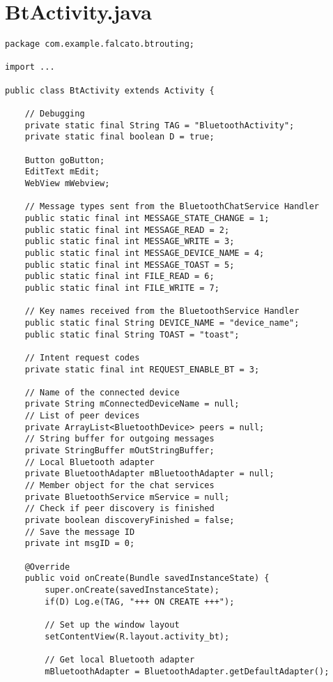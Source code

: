 \section{BtActivity.java}
\label{appendix:BtActivity}
\begin{verbatim}
package com.example.falcato.btrouting;

import ...

public class BtActivity extends Activity {

    // Debugging
    private static final String TAG = "BluetoothActivity";
    private static final boolean D = true;

    Button goButton;
    EditText mEdit;
    WebView mWebview;

    // Message types sent from the BluetoothChatService Handler
    public static final int MESSAGE_STATE_CHANGE = 1;
    public static final int MESSAGE_READ = 2;
    public static final int MESSAGE_WRITE = 3;
    public static final int MESSAGE_DEVICE_NAME = 4;
    public static final int MESSAGE_TOAST = 5;
    public static final int FILE_READ = 6;
    public static final int FILE_WRITE = 7;

    // Key names received from the BluetoothService Handler
    public static final String DEVICE_NAME = "device_name";
    public static final String TOAST = "toast";

    // Intent request codes
    private static final int REQUEST_ENABLE_BT = 3;

    // Name of the connected device
    private String mConnectedDeviceName = null;
    // List of peer devices
    private ArrayList<BluetoothDevice> peers = null;
    // String buffer for outgoing messages
    private StringBuffer mOutStringBuffer;
    // Local Bluetooth adapter
    private BluetoothAdapter mBluetoothAdapter = null;
    // Member object for the chat services
    private BluetoothService mService = null;
    // Check if peer discovery is finished
    private boolean discoveryFinished = false;
    // Save the message ID
    private int msgID = 0;

    @Override
    public void onCreate(Bundle savedInstanceState) {
        super.onCreate(savedInstanceState);
        if(D) Log.e(TAG, "+++ ON CREATE +++");

        // Set up the window layout
        setContentView(R.layout.activity_bt);

        // Get local Bluetooth adapter
        mBluetoothAdapter = BluetoothAdapter.getDefaultAdapter();


\end{verbatim}
